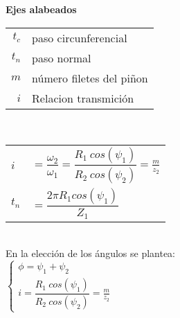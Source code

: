 \documentclass[11pt,a4paper]{article}
\begin{document}
\begin{multicols}{2}
	\vspace*{0.2cm}
		\textbf{Ejes alabeados}\\
		\begin{tabular}{r l}
			$t_c$& paso circunferencial\\
			$t_n$& paso normal\\
			$m$& número filetes del piñon\\
			$i$&		Relacion transmición\\
		\end{tabular}\\

		\begin{tabular}{l l} $i$&$=\dfrac{\omega_2}{\omega_1}=\dfrac{R_1 ~ cos(\psi_1)}{R_2 ~ cos(\psi_2)}=\frac{m}{z_2}$\\
		$t_n$&$=\dfrac{2\pi R_1 cos(\psi_1)}{Z_1}$\\
		\end{tabular}\\
		En la elección de los ángulos se plantea:\\
		$\left\{\begin{array}{l}
			\phi=\psi_1+\psi_2\\
			i=\dfrac{R_1 ~ cos(\psi_1)}{R_2 ~ cos(\psi_2)}=\frac{m}{z_2}
		\end{array} \right.$
		
		
		
		
	\end{multicols}
\end{document}
